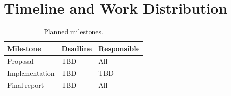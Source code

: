 \section{Timeline and Work Distribution}
\label{sec:timeline}

\begin{table}[htbp]
  \centering
  \begin{tabular}{@{}lll@{}}
    \toprule
    \textbf{Milestone} & \textbf{Deadline} & \textbf{Responsible} \\
    \midrule
    Proposal       & TBD & All \\
    Implementation & TBD & TBD \\
    Final report   & TBD & All \\
    \bottomrule
  \end{tabular}
  \caption{Planned milestones.}
  \label{tab:timeline}
\end{table}
